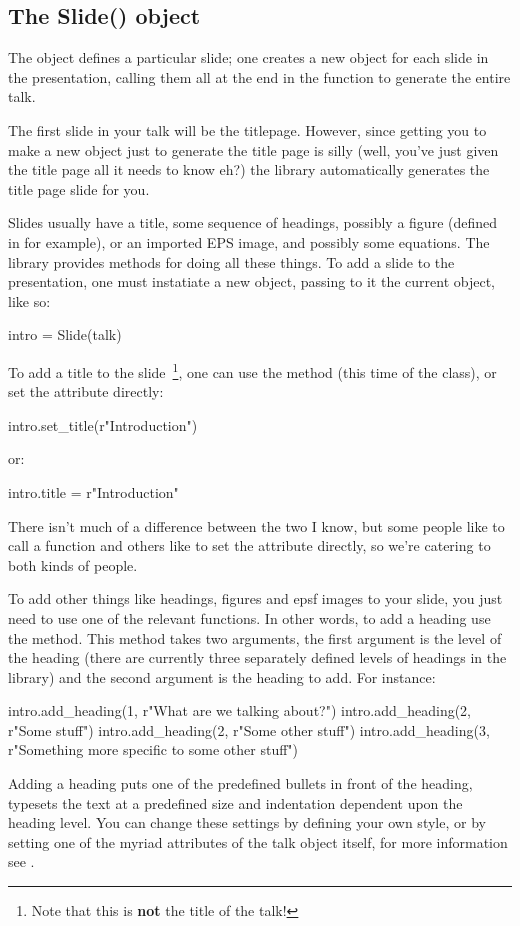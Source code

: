\subsection{The Slide() object}

The  object defines a particular slide; one creates a new
 object for each slide in the presentation, calling them all at
the end in the  function to generate the entire talk.  

The first slide in your talk will be the titlepage.  However, since getting
you to make a new  object just to generate the title page is
silly (well, you've just given the title page all it needs to know eh?) the
library automatically generates the title page slide for you.

Slides usually have a title, some sequence of headings, possibly a figure
(defined in \pyscript for example), or an imported EPS image, and possibly
some equations.  The  library provides methods for doing
all these things.  To add a slide to the presentation, one must instatiate a
new  object, passing to it the current  object, like
so:
\begin{python}
intro = Slide(talk)
\end{python}

To add a title to the slide~\footnote{Note that this is
\textbf{not} the title of the talk!}, one can use the 
method (this time of the  class), or set the 
attribute directly:
\begin{python}
intro.set_title(r"Introduction")
\end{python}
or:
\begin{python}
intro.title = r"Introduction"
\end{python}
There isn't much of a difference between the two I know, but some people
like to call a  function and others like to set the attribute
directly, so we're catering to both kinds of people.

To add other things like headings, figures and epsf images to your slide,
you just need to use one of the relevant  functions.  In other
words, to add a heading use the  method.  This method
takes two arguments, the first argument is the level of the heading (there
are currently three separately defined levels of headings in the library)
and the second argument is the heading to add.  For instance:
\begin{python}
intro.add_heading(1, r"What are we talking about?")
intro.add_heading(2, r"Some stuff")
intro.add_heading(2, r"Some other stuff")
intro.add_heading(3, r"Something more specific to some other stuff")
\end{python}
Adding a heading puts one of the predefined bullets in front of the heading,
typesets the text at a predefined size and indentation dependent upon the
heading level.  You can change these settings by defining your own style, or
by setting one of the myriad attributes of the talk object itself, for more
information see .

